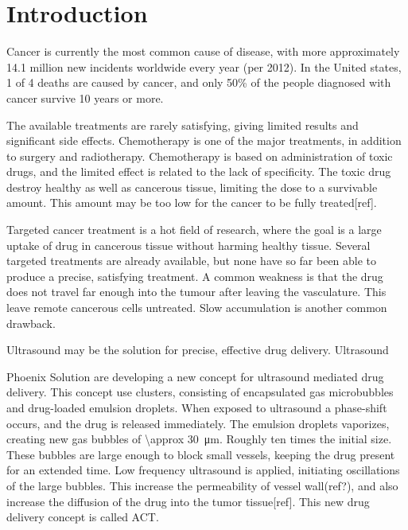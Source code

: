 \section{Introduction}

Cancer is currently the most common cause of disease, with more approximately 14.1 million new incidents worldwide every year (per 2012)\cite{cancer1}. In the United states, 1 of 4 deaths are caused by cancer\cite{Siegel2014}, and only 50\% of the people diagnosed with cancer survive 10 years or more. 

The available treatments are rarely satisfying, giving limited results and significant side effects. Chemotherapy is one of the major treatments, in addition to surgery and radiotherapy. Chemotherapy is based on administration of toxic drugs, and the limited effect is related to the lack of specificity. The toxic drug destroy healthy as well as cancerous tissue, limiting the dose to a survivable amount. This amount may be too low for the cancer to be fully treated[ref].

Targeted cancer treatment is a hot field of research, where the goal is a large uptake of drug in cancerous tissue without harming healthy tissue. Several targeted treatments are already available, but none have so far been able to produce a precise,  satisfying treatment. A common weakness is that the drug does not travel far enough into the tumour after leaving the vasculature. This leave remote cancerous cells untreated. Slow accumulation is another common drawback. 

Ultrasound may be the solution for precise, effective drug delivery. Ultrasound 

Phoenix Solution are developing a new concept for ultrasound mediated drug delivery. This concept use clusters, consisting of encapsulated gas microbubbles and drug-loaded emulsion droplets. When exposed to ultrasound a phase-shift occurs, and the drug is released immediately. The emulsion droplets vaporizes, creating new gas bubbles of \SI{\approx 30}{\micro\meter}. Roughly ten times the initial size. These bubbles are large enough to block small vessels, keeping the drug present for an extended time. Low frequency ultrasound is applied, initiating oscillations of the large bubbles. This increase the permeability of vessel wall(ref?), and also increase the diffusion of the drug into the tumor tissue[ref]. This new drug delivery concept is called ACT\textregistered.

